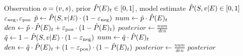 \begin{singlespace}
\begin{algorithm}[H]
    \caption{Bayesian Update Step: $\epe.\update{\observation, \estpe_t, \estpsge}$}
    \label{alg:bayesian_update_impl}
    \begin{algorithmic}
        \Require Observation $o=(v,s)$, prior $\hat{P}(E)_t \in [0,1]$, model estimate $\hat{P}(S,v|E) \in [0,1]$
        \Require $\varepsilon_{\text{neg}}, \varepsilon_{\text{pos}}$ 
         
            \State $\tilde{p} \gets \hat{P}(S,v|E) \cdot (1-\varepsilon_{\text{neg}})$
            \State $num \gets \tilde{p}\cdot \hat{P}(E)_t$
            \State $den \gets \tilde{p}\cdot \hat{P}(E)_t + \varepsilon_{\text{pos}}\cdot(1-\hat{P}(E)_t)$
            \State $posterior \gets \frac{num}{den}$
        \Else {}
            \State $\tilde{q} \gets 1 - \hat{P}(S,v|E) \cdot (1-\varepsilon_{\text{neg}})$
            \State $num \gets \tilde{q}\cdot \hat{P}(E)_t$
            \State $den \gets \tilde{q}\cdot \hat{P}(E)_t + (1-\varepsilon_{\text{pos}})\cdot(1-\hat{P}(E)_t)$
            \State $posterior \gets \frac{num}{den}$
        \EndIf
        \State \Return $posterior$
    \end{algorithmic}
\end{algorithm}
\end{singlespace}
